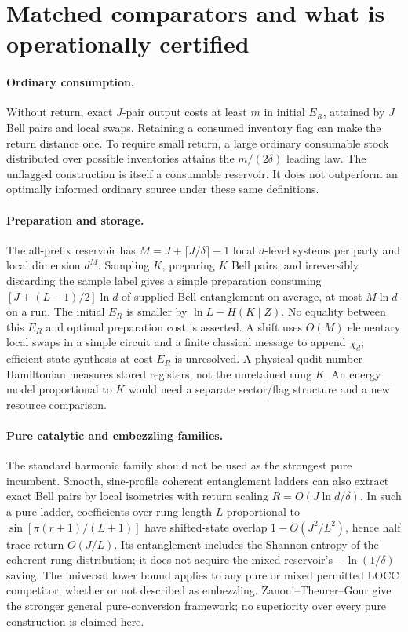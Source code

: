 \documentclass[11pt,a4paper]{article}
\newcommand{\ER}{E_R}
\begin{document}
\section{Matched comparators and what is operationally certified}
\paragraph{Ordinary consumption.}
Without return, exact \(J\)-pair output costs at least \(m\) in initial
\(\ER\), attained by \(J\) Bell pairs and local swaps. Retaining a consumed
inventory flag can make the return distance one. To require small return,
a large ordinary consumable stock distributed over possible inventories
attains the \(m/(2\delta)\) leading law. The unflagged construction is itself
a consumable reservoir. It does not outperform an optimally informed
ordinary source under these same definitions.

\paragraph{Preparation and storage.}
The all-prefix reservoir has \(M=J+\lceil J/\delta\rceil-1\) local
\(d\)-level systems per party and local dimension \(d^M\).
Sampling \(K\), preparing \(K\) Bell pairs, and irreversibly discarding the
sample label gives a simple preparation consuming
\([J+(L-1)/2]\ln d\) of supplied Bell entanglement on average,
at most \(M\ln d\) on a run.
The initial \(\ER\) is smaller by \(\ln L-H(K\mid Z)\).
No equality between this \(\ER\) and optimal preparation cost is asserted.
A shift uses \(O(M)\) elementary local swaps in a simple circuit and a
finite classical message to append \(\chi_d\); efficient state synthesis at
cost \(\ER\) is unresolved.
A physical qudit-number Hamiltonian measures stored registers, not the
unretained rung \(K\). An energy model proportional to \(K\) would need a
separate sector/flag structure and a new resource comparison.

\paragraph{Pure catalytic and embezzling families.}
The standard harmonic family should not be used as the strongest pure
incumbent. Smooth, sine-profile coherent entanglement ladders can also
extract exact Bell pairs by local isometries with return scaling
\(R=O(J\ln d/\delta)\). In such a pure ladder, coefficients over rung
length \(L\) proportional to \(\sin[\pi(r+1)/(L+1)]\) have shifted-state
overlap \(1-O(J^2/L^2)\), hence half trace return \(O(J/L)\).
Its entanglement includes the Shannon entropy of the coherent rung
distribution; it does not acquire the mixed reservoir's
\(-\ln(1/\delta)\) saving. The universal lower bound applies to any pure or
mixed permitted LOCC competitor, whether or not described as embezzling.
Zanoni--Theurer--Gour give the stronger general pure-conversion framework;
no superiority over every pure construction is claimed here.
\end{document}
